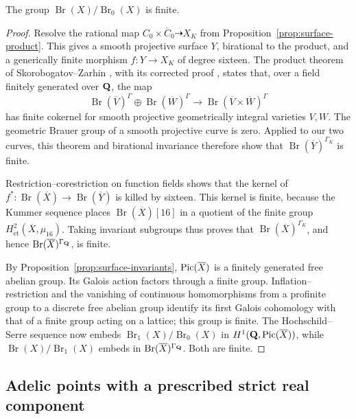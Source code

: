 \begin{proposition}\label{prop:surface-brauer-finite}
The group $\operatorname{Br}(X)/\operatorname{Br}_0(X)$ is finite.
\end{proposition}

\begin{proof}
Resolve the rational map $C_0\times\overline C_0\dashrightarrow X_K$
from Proposition~\ref{prop:surface-product}.  This gives a smooth
projective surface $Y$, birational to the product, and a generically
finite morphism $f:Y\to X_K$ of degree sixteen.
The product theorem of Skorobogatov--Zarhin
\cite[Theorem~A]{skorobogatovzarhin2014}, with its corrected proof
\cite{skorobogatovzarhin2023}, states that, over a field finitely
generated over $\mathbf Q$, the map
\[
 \operatorname{Br}(\overline V)^{\Gamma}\oplus
 \operatorname{Br}(\overline W)^{\Gamma}
 \longrightarrow
 \operatorname{Br}(\overline V\times\overline W)^{\Gamma}
\]
has finite cokernel for smooth projective geometrically integral
varieties $V,W$.  The geometric Brauer group of a smooth projective
curve is zero.  Applied to our two curves, this theorem and
birational invariance therefore show that
$\operatorname{Br}(\overline Y)^{\Gamma_K}$ is finite.

Restriction--corestriction on function fields shows that the kernel of
$f^*: \operatorname{Br}(\overline X)\to\operatorname{Br}(\overline Y)$
is killed by sixteen.  This kernel is finite, because the Kummer
sequence places $\operatorname{Br}(\overline X)[16]$ in a quotient of
the finite group $H^2_{\mathrm{\acute et}}(\overline X,\mu_{16})$.
Taking invariant subgroups thus proves that
$\operatorname{Br}(\overline X)^{\Gamma_K}$, and hence
$\operatorname{Br}(\overline X)^{\Gamma_\mathbf Q}$, is finite.

By Proposition~\ref{prop:surface-invariants}, $\operatorname{Pic}(\overline X)$
is a finitely generated free abelian group.  Its Galois action factors
through a finite group.  Inflation--restriction and the vanishing of
continuous homomorphisms from a profinite group to a discrete free
abelian group identify its first Galois cohomology with that of a
finite group acting on a lattice; this group is finite.  The
Hochschild--Serre sequence now embeds
$\operatorname{Br}_1(X)/\operatorname{Br}_0(X)$ in
$H^1(\mathbf Q,\operatorname{Pic}(\overline X))$, while
$\operatorname{Br}(X)/\operatorname{Br}_1(X)$ embeds in
$\operatorname{Br}(\overline X)^{\Gamma_\mathbf Q}$.  Both are finite.
\end{proof}

\subsection{Adelic points with a prescribed strict real component}

